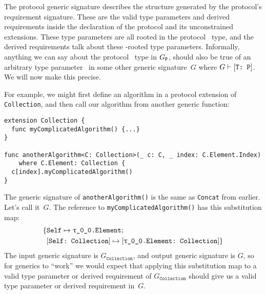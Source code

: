 \documentclass[../generics]{subfiles}
\begin{document}
The protocol generic signature describes the structure generated by the protocol's requirement signature. These are the valid type parameters and derived requirements inside the declaration of the protocol and its unconstrained extensions. These type parameters are all rooted in the protocol \tSelf\ type, and the derived requirements talk about these \tSelf-rooted type parameters. Informally, anything we can say about the protocol \tSelf\ type in $G_{\texttt{P}}$, should also be true of an arbitrary type parameter \tT\ in some other generic signature~$G$ where $G\vdash[\texttt{T:~P}]$. We will now make this precise.

For example, we might first define an algorithm in a protocol extension of \texttt{Collection}, and then call our algorithm from another generic function:
\begin{Verbatim}
extension Collection {
  func myComplicatedAlgorithm() {...}
}

func anotherAlgorithm<C: Collection>(_ c: C, _ index: C.Element.Index)
    where C.Element: Collection {
  c[index].myComplicatedAlgorithm()
}
\end{Verbatim}
The generic signature of \texttt{anotherAlgorithm()} is the same as \texttt{Concat} from earlier. Let's call it~$G$. The reference to \texttt{myComplicatedAlgorithm()} has this substitution map:
\begin{align*}
\SubstMapC{&\SubstType{Self}{\rT.Element}}{\\
&\SubstConf{Self}{\rT.Element}{Collection}}
\end{align*}
The input generic signature is $G_\texttt{Collection}$, and output generic signature is $G$, so for generics to ``work'' we would expect that applying this substitution map to a valid type parameter or derived requirement of $G_\texttt{Collection}$ should give us a valid type parameter or derived requirement in~$G$.
\end{document}
